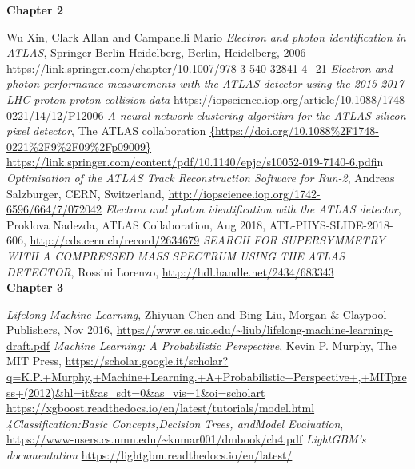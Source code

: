 \documentclass[a4paper, oneside]{book}
\begin{document}
\begin{thebibliography}{17}
		 	\textbf{\Large Chapter 2} 
		 	
			 Wu Xin, Clark Allan and Campanelli Mario \textit{Electron and photon identification in ATLAS}, Springer Berlin Heidelberg, Berlin, Heidelberg, 2006
			\url{https://link.springer.com/chapter/10.1007/978-3-540-32841-4_21} 
			\textit{Electron and photon performance measurements with the {ATLAS} detector using the 2015-2017 {LHC} proton-proton collision data}
			\url{https://iopscience.iop.org/article/10.1088/1748-0221/14/12/P12006}
			 \textit{A neural network clustering algorithm for the ATLAS silicon pixel detector}, The ATLAS collaboration
			\url{{https://doi.org/10.1088%2F1748-0221%2F9%2F09%2Fp09009}}
			\url{https://link.springer.com/content/pdf/10.1140/epjc/s10052-019-7140-6.pdf}in
			 \textit{Optimisation of the ATLAS Track Reconstruction Software for Run-2}, Andreas Salzburger, CERN, Switzerland, \url{http://iopscience.iop.org/1742-6596/664/7/072042}
			 \textit{Electron and photon identification with the ATLAS detector}, Proklova Nadezda, ATLAS Collaboration, Aug 2018, ATL-PHYS-SLIDE-2018-606, \url{http://cds.cern.ch/record/2634679}
			 \textit{SEARCH FOR SUPERSYMMETRY WITH A COMPRESSED MASS SPECTRUM USING THE ATLAS DETECTOR}, Rossini Lorenzo, \url{http://hdl.handle.net/2434/683343 }\\
			
			\textbf{\Large Chapter 3}
			
			 \textit{Lifelong Machine Learning}, Zhiyuan Chen and Bing Liu, Morgan \& Claypool Publishers, Nov 2016, \url{https://www.cs.uic.edu/~liub/lifelong-machine-learning-draft.pdf}
			 \textit{Machine Learning: A Probabilistic Perspective}, Kevin P. Murphy, The MIT Press, \url{https://scholar.google.it/scholar?q=K.P.+Murphy,+Machine+Learning.+A+Probabilistic+Perspective+,+MITpress+(2012)&hl=it&as_sdt=0&as_vis=1&oi=scholart}
			 \url{https://xgboost.readthedocs.io/en/latest/tutorials/model.html}
			 \textit{4Classification:Basic Concepts,Decision Trees, andModel Evaluation}, \url{https://www-users.cs.umn.edu/~kumar001/dmbook/ch4.pdf}
			 \textit{LightGBM’s documentation} 
			\url{https://lightgbm.readthedocs.io/en/latest/}
	\end{thebibliography}
\end{document}
